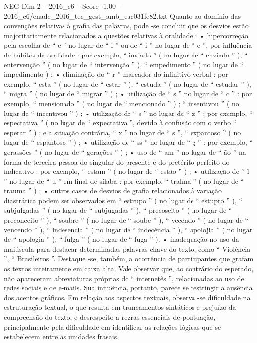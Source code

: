\begin{textsample}{NEG Dim 2 – 2016\_c6 – Score -1.00 – 2016\_c6/enade\_2016\_tec\_gest\_amb\_eac031fe82.txt}
Quanto ao domínio das convenções relativas à grafia das palavras, pode -se concluir que os desvios estão majoritariamente relacionados a questões relativas à oralidade : • hipercorreção pela escolha de “ e ” no lugar de “ i ” ou de “ i ” no lugar de “ e ”, por influência de hábitos da oralidade : por exemplo, “ inviado ” ( no lugar de “ enviado ” ), “ entervenção ” ( no lugar de “ intervenção ” ), “ empedimento ” ( no lugar de “ impedimento ) ; • eliminação do “ r ” marcador do infinitivo verbal : por exemplo, “ esta ” ( no lugar de “ estar ” ), “ estuda ” ( no lugar de “ estudar ” ), “ migra ” ( no lugar de “ migrar ” ) ; • utilização de “ s ” no lugar de “ c ” : por exemplo, “ mensionado ” ( no lugar de “ mencionado ” ) ; “ insentivou ” ( no lugar de “ incentivou ” ) ; • utilização de “ s ” no lugar de “ x ” : por exemplo, “ espectativa ” ( no lugar de “ expectativa ”, devido à confusão com o verbo “ esperar ” ) ; e a situação contrária, “ x ” no lugar de “ s ”, “ expantoso ” ( no lugar de “ espantoso ” ) ; • utilização de “ ss ” no lugar de “ ç ” : por exemplo, “ gerassões ” ( no lugar de “ gerações ” ) ; • uso de “ am ” no lugar de “ ão ” na forma de terceira pessoa do singular do presente e do pretérito perfeito do indicativo : por exemplo, “ estam ” ( no lugar de “ estão ” ) ; • utilização de “ l ” no lugar de “ u ” em final de sílaba : por exemplo, “ tralma ” ( no lugar de “ trauma ” ) ; • outros casos de desvios de grafia relacionados à variação diastrática podem ser observados em “ estrupo ” ( no lugar de “ estupro ” ), “ subjulgadas ” ( no lugar de “ subjugadas ” ), “ precoseito ” ( no lugar de “ preconceito ” ), “ soubre ” ( no lugar de “ soube ” ), “ vecendo ” ( no lugar de “ vencendo ” ), “ indesencia ” ( no lugar de “ indecência ” ), “ apolojia ” ( no lugar de “ apologia ” ), “ fulga ” ( no lugar de “ fuga ” ). • inadequação no uso da maiúscula para destacar determinadas palavras-chave do texto, como “ Violência ”, “ Brasileiros ”.
Destaque -se, também, a ocorrência de participantes que grafam os textos inteiramente em caixa alta.
Vale observar que, ao contrário do esperado, não apareceram abreviaturas próprias do “ internetês ”, relacionadas ao uso de redes sociais e de e-mails.
Sua influência, portanto, parece se restringir à ausência dos acentos gráficos.
Em relação aos aspectos textuais, observa -se dificuldade na estruturação textual, o que resulta em truncamentos sintáticos e prejuízo da compreensão do texto, e desrespeito a regras essenciais de pontuação, principalmente pela dificuldade em identificar as relações lógicas que se estabelecem entre as unidades frasais.

\end{textsample}
